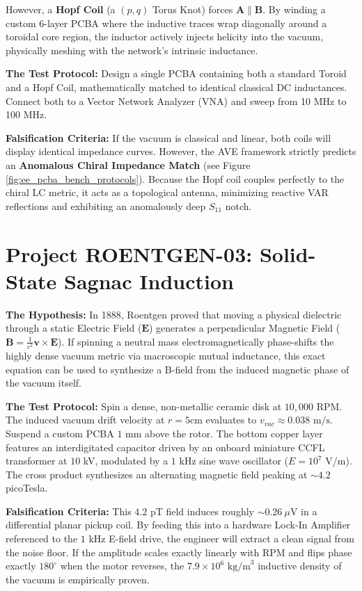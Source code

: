 However, a \textbf{Hopf Coil} (a $(p,q)$ Torus Knot) forces $\mathbf{A} \parallel \mathbf{B}$. By winding a custom 6-layer PCBA where the inductive traces wrap diagonally around a toroidal core region, the inductor actively injects helicity into the vacuum, physically meshing with the network's intrinsic inductance.

\textbf{The Test Protocol:} Design a single PCBA containing both a standard Toroid and a Hopf Coil, mathematically matched to identical classical DC inductances. Connect both to a Vector Network Analyzer (VNA) and sweep from 10 MHz to 100 MHz.

\textbf{Falsification Criteria:} If the vacuum is classical and linear, both coils will display identical impedance curves. However, the AVE framework strictly predicts an \textbf{Anomalous Chiral Impedance Match} (see Figure \ref{fig:ee_pcba_bench_protocols}). Because the Hopf coil couples perfectly to the chiral LC metric, it acts as a topological antenna, minimizing reactive VAR reflections and exhibiting an anomalously deep $S_{11}$ notch.

\section{Project ROENTGEN-03: Solid-State Sagnac Induction}
\textbf{The Hypothesis:} In 1888, Roentgen proved that moving a physical dielectric through a static Electric Field ($\mathbf{E}$) generates a perpendicular Magnetic Field ($\mathbf{B} = \frac{1}{c^2} \mathbf{v} \times \mathbf{E}$). If spinning a neutral mass electromagnetically phase-shifts the highly dense vacuum metric via macroscopic mutual inductance, this exact equation can be used to synthesize a B-field from the induced magnetic phase of the vacuum itself.

\textbf{The Test Protocol:} Spin a dense, non-metallic ceramic disk at $10,000$ RPM. The induced vacuum drift velocity at $r=5$cm evaluates to $v_{vac} \approx 0.038 \text{ m/s}$. Suspend a custom PCBA $1$ mm above the rotor. The bottom copper layer features an interdigitated capacitor driven by an onboard miniature CCFL transformer at $10$ kV, modulated by a $1$ kHz sine wave oscillator ($E = 10^7$ V/m). The cross product synthesizes an alternating magnetic field peaking at $\sim 4.2$ picoTesla. 

\textbf{Falsification Criteria:} This $4.2$ pT field induces roughly $\sim 0.26 \ \mu$V in a differential planar pickup coil. By feeding this into a hardware Lock-In Amplifier referenced to the $1$ kHz E-field drive, the engineer will extract a clean signal from the noise floor. If the amplitude scales exactly linearly with RPM and flips phase exactly $180^\circ$ when the motor reverses, the $7.9 \times 10^6 \text{ kg/m}^3$ inductive density of the vacuum is empirically proven.

